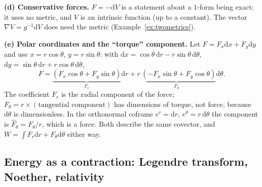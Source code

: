 \documentclass[11pt,a4paper]{article}
\numberwithin{equation}{section}
\theoremstyle{definition}
\theoremstyle{plain}
\newcommand{\dd}{\mathrm{d}}
\begin{document}
\textbf{(d) Conservative forces.} $F=-\dd V$ is a statement about a $1$-form being exact; it uses no metric, and $V$ is an intrinsic function (up to a constant). The vector $\nabla V=g^{-1}\dd V$ does need the metric (Example~\ref{ex:twometrics}).

\textbf{(e) Polar coordinates and the ``torque'' component.} Let $F=F_x\dd x+F_y\dd y$ and use $x=r\cos\theta$, $y=r\sin\theta$: with $\dd x=\cos\theta\,\dd r-r\sin\theta\,\dd\theta$, $\dd y=\sin\theta\,\dd r+r\cos\theta\,\dd\theta$,
\[
F=\underbrace{(F_x\cos\theta+F_y\sin\theta)}_{F_r}\dd r+\underbrace{r\,(-F_x\sin\theta+F_y\cos\theta)}_{F_\theta}\dd\theta .
\]
The coefficient $F_r$ is the radial component of the force; $F_\theta=r\times(\text{tangential component})$ has dimensions of torque, not force, because $\dd\theta$ is dimensionless. In the orthonormal coframe $e^r=\dd r$, $e^\theta=r\,\dd\theta$ the component is $\hat F_\theta=F_\theta/r$, which is a force. Both describe the same covector, and $W=\int F_r\dd r+F_\theta\dd\theta$ either way.

\subsection{Energy as a contraction: Legendre transform, Noether, relativity}\label{sec:phys-energy}
\end{document}
